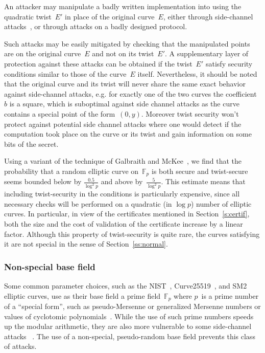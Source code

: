 \documentclass[twocolumn,letterpaper,10pt]{article}
\def\F{\mathbb{F}}
\begin{document}
An attacker may manipulate a badly written implementation
into using the quadratic twist~$E'$
in place of the original curve~$E$,
either through side-channel attacks~\cite{fdtc2008flrv},
or through attacks on a badly designed protocol.

Such attacks may be easily mitigated by checking
that the manipulated points are on the original curve~$E$
and not on its twist~$E'$.
A supplementary layer of protection against these attacks
can be obtained if the twist~$E'$ satisfy
security conditions similar to those of the curve~$E$ itself.
Nevertheless, it should be noted that the original curve and
its twist will never share the same exact behavior against
side-channel attacks, e.g. for exactly one of the two curves the coefficient $b$
is a square, which is suboptimal against side channel attacks
as the curve contains a special point of the form~$(0, y)$.
Moreover twist security won't protect against potential side channel attacks
where one would detect if the computation took place on the curve or its twist
and gain information on some bits of the secret.

Using a variant of the technique of Galbraith and McKee~\cite{lms2000gm},
we find that the probability that a random elliptic curve on~$\F_p$
is both secure and twist-secure
seems bounded below by $\frac{0.5}{\log^2 p}$
and above by~$\frac{5}{\log^2 p}$.
This estimate means that
including twist-security in the conditions is particularly expensive,
since all necessary checks will be performed on
a quadratic (in $\log p$) number of elliptic curves.
In particular, in view of
the certificates mentioned in Section~\ref{s:certif},
both the size and the cost of validation of the certificate
increase by a linear factor.
Although this property of twist-security is quite rare,
the curves satisfying it are not special
in the sense of Section~\ref{ss:normal}.

\subsubsection{Non-special base field}
\label{sss:special-side}

Some common parameter choices,
such as the NIST~\cite{nist2000fips186-2},
Curve25519~\cite{pkc2006bernstein},
and SM2~\cite{oscca2010sm2} elliptic curves,
use as their base field a prime field~$\F_p$
where $p$~is a prime number of a ``special form'',
such as pseudo-Mersenne or generalized Mersenne numbers
or values of cyclotomic polynomials~\cite{mc2013gm}.
While the use of such prime numbers speeds up the modular arithmetic,
they are also more vulnerable to some side-channel attacks%
~\cite{ches2005dkj,ics2005ss,ches2014bpsy,eprint2014psy,ieice2006ss,indo2014frv}.
The use of a non-special, pseudo-random base field
prevents this class of attacks.
\end{document}
